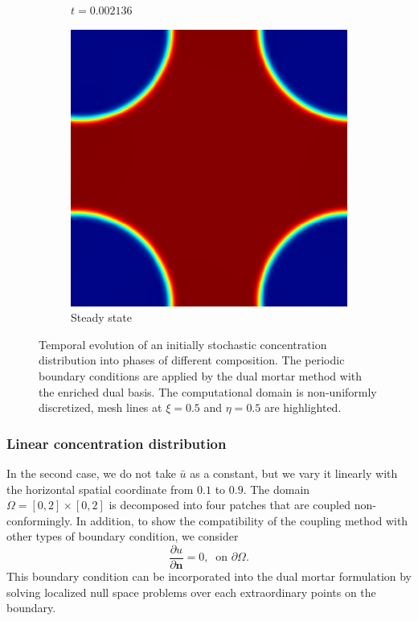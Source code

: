 \begin{figure}[ht]
\begin{subfigure}[t]{.3\linewidth}
		\vspace{-.4\baselineskip}
		\caption{{$t=0.002136$}}
	\end{subfigure}
	\begin{subfigure}[t]{.3\linewidth}
		\center
		\includegraphics[scale=.25]{stochastic_ch_8}
		\vspace{-.4\baselineskip}
		\caption{Steady state}
	\end{subfigure}
	\caption{Temporal evolution of an initially stochastic concentration distribution into phases of different composition. The periodic boundary conditions are applied by the dual mortar method with the enriched dual basis. The computational domain is non-uniformly discretized, mesh lines at $\xi=0.5$ and $\eta=0.5$ are highlighted.}\label{fig:phase_field_stochastic}
\end{figure}

\subsubsection{Linear concentration distribution}

In the second case, we do not take $\bar{u}$ as a constant, but we vary it linearly with the horizontal spatial coordinate from $0.1$ to $0.9$. The domain $\Omega = \left[ 0, 2 \right] \times \left[ 0, 2 \right]$ is decomposed into four patches that are coupled non-conformingly. In addition, to show the compatibility of the coupling method with other types of boundary condition, we consider
\begin{equation}
	\frac{ \partial u}{ \partial \mathbf{n}} = 0, \;\; \text{on }\partial \Omega.
\end{equation}
This boundary condition can be incorporated into the dual mortar formulation by solving localized null space problems over each extraordinary points on the boundary. \par

